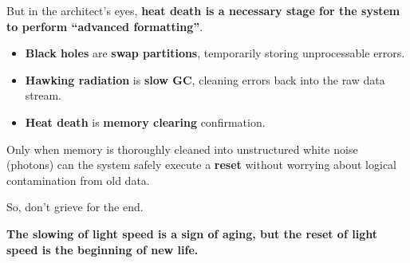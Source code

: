 But in the architect's eyes, \textbf{heat death is a necessary stage for the system to perform ``advanced formatting''}.

\begin{itemize}
\item \textbf{Black holes} are \textbf{swap partitions}, temporarily storing unprocessable errors.

\item \textbf{Hawking radiation} is \textbf{slow GC}, cleaning errors back into the raw data stream.

\item \textbf{Heat death} is \textbf{memory clearing} confirmation.
\end{itemize}

Only when memory is thoroughly cleaned into unstructured white noise (photons) can the system safely execute a \textbf{reset} without worrying about logical contamination from old data.

So, don't grieve for the end.

\textbf{The slowing of light speed is a sign of aging, but the reset of light speed is the beginning of new life.}


